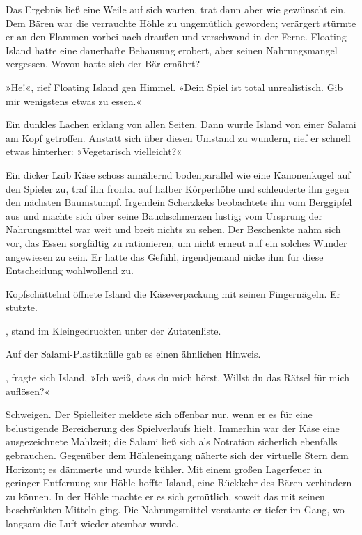 Das Ergebnis ließ eine Weile auf sich warten, trat dann aber wie gewünscht ein. Dem Bären war die verrauchte Höhle zu ungemütlich geworden; verärgert stürmte er an den Flammen vorbei nach draußen und verschwand in der Ferne. Floating Island hatte eine dauerhafte Behausung erobert, aber seinen Nahrungsmangel vergessen. Wovon hatte sich der Bär ernährt?

»He!«, rief Floating Island gen Himmel. »Dein Spiel ist total unrealistisch. Gib mir wenigstens etwas zu essen.«

Ein dunkles Lachen erklang von allen Seiten. Dann wurde Island von einer Salami am Kopf getroffen. Anstatt sich über diesen Umstand zu wundern, rief er schnell etwas hinterher: »Vegetarisch vielleicht?«

Ein dicker Laib Käse schoss annähernd bodenparallel wie eine Kanonenkugel auf den Spieler zu, traf ihn frontal auf halber Körperhöhe und schleuderte ihn gegen den nächsten Baumstumpf. Irgendein Scherzkeks beobachtete ihn vom Berggipfel aus und machte sich über seine Bauchschmerzen lustig; vom Ursprung der Nahrungsmittel war weit und breit nichts zu sehen. Der Beschenkte nahm sich vor, das Essen sorgfältig zu rationieren, um nicht erneut auf ein solches Wunder angewiesen zu sein. Er hatte das Gefühl, irgendjemand nicke ihm für diese Entscheidung wohlwollend zu.

Kopfschüttelnd öffnete Island die Käseverpackung mit seinen Fingernägeln. Er stutzte.

, stand im Kleingedruckten unter der Zutatenliste. 

Auf der Salami-Plastikhülle gab es einen ähnlichen Hinweis. 

, fragte sich Island,  »Ich weiß, dass du mich hörst. Willst du das Rätsel für mich auflösen?«

Schweigen. Der Spielleiter meldete sich offenbar nur, wenn er es für eine belustigende Bereicherung des Spielverlaufs hielt. Immerhin war der Käse eine ausgezeichnete Mahlzeit; die Salami ließ sich als Notration sicherlich ebenfalls gebrauchen. Gegenüber dem Höhleneingang näherte sich der virtuelle Stern dem Horizont; es dämmerte und wurde kühler. Mit einem großen Lagerfeuer in geringer Entfernung zur Höhle hoffte Island, eine Rückkehr des Bären verhindern zu können. In der Höhle machte er es sich gemütlich, soweit das mit seinen beschränkten Mitteln ging. Die Nahrungsmittel verstaute er tiefer im Gang, wo langsam die Luft wieder atembar wurde.

